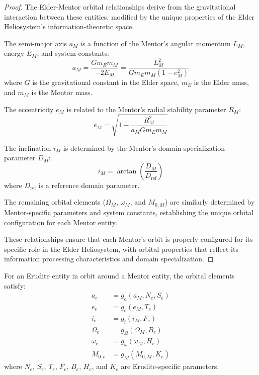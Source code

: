 \begin{proof}
The Elder-Mentor orbital relationships derive from the gravitational interaction between these entities, modified by the unique properties of the Elder Heliosystem's information-theoretic space.

The semi-major axis $a_M$ is a function of the Mentor's angular momentum $L_M$, energy $E_M$, and system constants:
\begin{equation}
a_M = \frac{G m_E m_M}{-2E_M} = \frac{L_M^2}{G m_E m_M (1 - e_M^2)}
\end{equation}
where $G$ is the gravitational constant in the Elder space, $m_E$ is the Elder mass, and $m_M$ is the Mentor mass.

The eccentricity $e_M$ is related to the Mentor's radial stability parameter $R_M$:
\begin{equation}
e_M = \sqrt{1 - \frac{R_M^2}{a_M G m_E m_M}}
\end{equation}

The inclination $i_M$ is determined by the Mentor's domain specialization parameter $D_M$:
\begin{equation}
i_M = \arctan\left(\frac{D_M}{D_{\text{ref}}}\right)
\end{equation}
where $D_{\text{ref}}$ is a reference domain parameter.

The remaining orbital elements ($\Omega_M$, $\omega_M$, and $M_{0,M}$) are similarly determined by Mentor-specific parameters and system constants, establishing the unique orbital configuration for each Mentor entity.

These relationships ensure that each Mentor's orbit is properly configured for its specific role in the Elder Heliosystem, with orbital properties that reflect its information processing characteristics and domain specialization.
\end{proof}

\begin{theorem}
For an Erudite entity in orbit around a Mentor entity, the orbital elements satisfy:
\begin{align}
a_e &= g_a(a_M, N_e, S_e) \\
e_e &= g_e(e_M, T_e) \\
i_e &= g_i(i_M, F_e) \\
\Omega_e &= g_{\Omega}(\Omega_M, B_e) \\
\omega_e &= g_{\omega}(\omega_M, H_e) \\
M_{0,e} &= g_M(M_{0,M}, K_e)
\end{align}
where $N_e$, $S_e$, $T_e$, $F_e$, $B_e$, $H_e$, and $K_e$ are Erudite-specific parameters.
\end{theorem}

